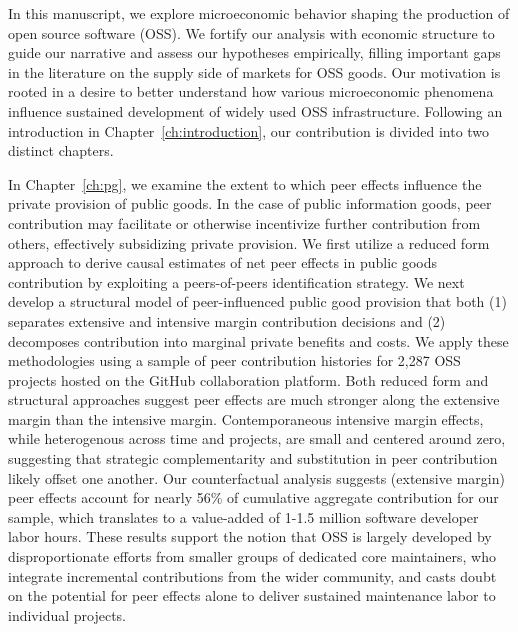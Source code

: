 
In this manuscript, we explore microeconomic behavior shaping the production of
open source software (OSS).  We fortify our analysis with economic structure to
guide our narrative and assess our hypotheses empirically, filling important
gaps in the literature on the supply side of markets for OSS goods.  Our
motivation is rooted in a desire to better understand how various microeconomic
phenomena influence sustained development of widely used OSS infrastructure.
Following an introduction in Chapter~\ref{ch:introduction}, our contribution is
divided into two distinct chapters.

In Chapter~\ref{ch:pg}, we examine the extent to which peer effects influence
the private provision of public goods.  In the case of public information goods,
peer contribution may facilitate or otherwise incentivize further contribution
from others, effectively subsidizing private provision.  We first utilize a
reduced form approach to derive causal estimates of net peer effects in public
goods contribution by exploiting a peers-of-peers identification strategy.  We
next develop a structural model of peer-influenced public good provision that
both (1) separates extensive and intensive margin contribution decisions and (2)
decomposes contribution into marginal private benefits and costs.  We apply
these methodologies using a sample of peer contribution histories for 2,287 OSS
projects hosted on the GitHub collaboration platform.  Both reduced form and
structural approaches suggest peer effects are much stronger along the extensive
margin than the intensive margin.  Contemporaneous intensive margin effects,
while heterogenous across time and projects, are small and centered around zero,
suggesting that strategic complementarity and substitution in peer contribution
likely offset one another.  Our counterfactual analysis suggests (extensive
margin) peer effects account for nearly 56\% of cumulative aggregate
contribution for our sample, which translates to a value-added of 1-1.5 million
software developer labor hours.  These results support the notion that OSS is
largely developed by disproportionate efforts from smaller groups of dedicated
core maintainers, who integrate incremental contributions from the wider
community, and casts doubt on the potential for peer effects alone to deliver
sustained maintenance labor to individual projects.

